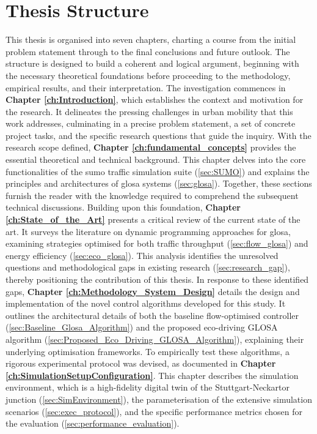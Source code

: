 \section{Thesis Structure}
\label{sec:Thesis_Structure}

This thesis is organised into seven chapters, charting a course from the initial problem statement through to the final conclusions and future outlook. The structure is designed to build a coherent and logical argument, beginning with the necessary theoretical foundations before proceeding to the methodology, empirical results, and their interpretation.
\mynewline
The investigation commences in \textbf{Chapter \ref{ch:Introduction}}, which establishes the context and motivation for the research. It delineates the pressing challenges in urban mobility that this work addresses, culminating in a precise problem statement, a set of concrete project tasks, and the specific research questions that guide the inquiry.
\mynewline
With the research scope defined, \textbf{Chapter \ref{ch:fundamental_concepts}} provides the essential theoretical and technical background. This chapter delves into the core functionalities of the \ac{sumo} traffic simulation suite (\ref{sec:SUMO}) and explains the principles and architectures of \ac{glosa} systems (\ref{sec:glosa}). Together, these sections furnish the reader with the knowledge required to comprehend the subsequent technical discussions.
\mynewline
Building upon this foundation, \textbf{Chapter \ref{ch:State_of_the_Art}} presents a critical review of the current state of the art. It surveys the literature on dynamic programming approaches for \ac{glosa}, examining strategies optimised for both traffic throughput (\ref{sec:flow_glosa}) and energy efficiency (\ref{sec:eco_glosa}). This analysis identifies the unresolved questions and methodological gaps in existing research (\ref{sec:research_gap}), thereby positioning the contribution of this thesis.
\mynewline
In response to these identified gaps, \textbf{Chapter \ref{ch:Methodology_System_Design}} details the design and implementation of the novel control algorithms developed for this study. It outlines the architectural details of both the baseline flow-optimised controller (\ref{sec:Baseline_Glosa_Algorithm}) and the proposed eco-driving GLOSA algorithm (\ref{sec:Proposed_Eco_Driving_GLOSA_Algorithm}), explaining their underlying optimisation frameworks.
\mynewline
To empirically test these algorithms, a rigorous experimental protocol was devised, as documented in \textbf{Chapter \ref{ch:SimulationSetupConfiguration}}. This chapter describes the simulation environment, which is a high-fidelity digital twin of the Stuttgart-Neckartor junction (\ref{sec:SimEnvironment}), the parameterisation of the extensive simulation scenarios (\ref{sec:exec_protocol}), and the specific performance metrics chosen for the evaluation (\ref{sec:performance_evaluation}).

